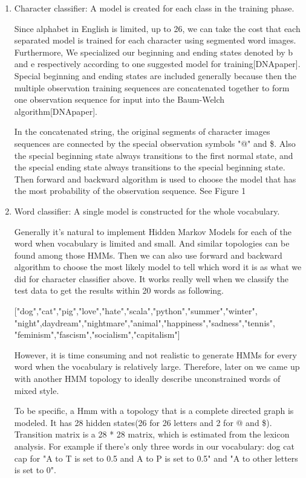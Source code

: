 \documentclass[11pt]{article}
\begin{document}
\begin{enumerate}
\item	Character classifier: A model is created for each class in the training phase.

Since alphabet in English is limited, up to 26, we can take the cost that each separated model is trained for each character using segmented word images.
Furthermore, We specialized our beginning and ending states denoted by b and e respectively according to one suggested model for training[DNApaper].
Special beginning and ending states are included generally because then the multiple observation training sequences are concatenated together to form one observation sequence for input into the Baum-Welch algorithm[DNApaper].

In the concatenated string, the original segments of character images sequences are connected by the special observation symbols "@" and \$.
 Also the special beginning state always transitions to the first normal state, and the special ending state always transitions to the special beginning state. Then forward and backward algorithm is used to choose the model that has the most probability of the observation sequence. See Figure 1



\item	Word classifier: A single model is constructed for the whole vocabulary. 

Generally it’s natural to implement Hidden Markov Models for each of the word when vocabulary is limited and small. And similar topologies can be found among those HMMs. Then we can also use forward and backward algorithm to choose the most likely model to tell which word it is as what we did for character classifier above. It works really well when we classify the test data to get the results within 20 words as following.

["dog","cat","pig","love","hate","scala","python","summer","winter",\\"night",daydream","nightmare","animal","happiness","sadness","tennis",\\"feminism","fascism","socialism","capitalism"]

However, it is time consuming and not realistic to generate HMMs for every word when the vocabulary is relatively large. Therefore, later on we came up with another HMM topology to ideally describe unconstrained words of mixed style.

To be specific, a Hmm  with a topology that is a complete directed graph is modeled. It has 28 hidden states(26 for 26 letters and 2 for @ and \$). 
Transition matrix is a 28 * 28 matrix, which is estimated from the lexicon analysis. For example if there's only three words in our vocabulary: dog cat cap for "A to T is set to 0.5 and A to P is set to 0.5" and "A to other letters is set to 0".


\end{enumerate}
\end{document}
